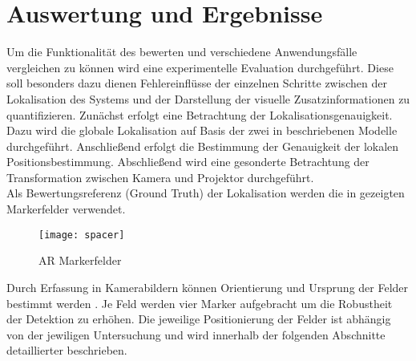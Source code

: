 \chapter{Auswertung und Ergebnisse}
\label{chap.results}

Um die Funktionalität des  bewerten und verschiedene Anwendungsfälle vergleichen zu können wird eine experimentelle Evaluation durchgeführt. Diese soll besonders dazu dienen Fehlereinflüsse der einzelnen Schritte zwischen der Lokalisation des Systems und der Darstellung der visuelle Zusatzinformationen zu quantifizieren. Zunächst erfolgt eine Betrachtung der Lokalisationsgenauigkeit. Dazu wird die globale Lokalisation auf Basis der zwei in  beschriebenen Modelle durchgeführt. Anschließend erfolgt die Bestimmung der Genauigkeit der lokalen Positionsbestimmung. Abschließend wird eine gesonderte Betrachtung der Transformation zwischen Kamera und Projektor durchgeführt.\\
Als Bewertungsreferenz (Ground Truth) der Lokalisation werden die in  gezeigten Markerfelder verwendet.

\begin{figure}[!ht]
	\begin{center}
		\texttt{[image: spacer]}
		\caption{AR Markerfelder}
		\label{fig.armarker}
	\end{center}
\end{figure}

Durch Erfassung in Kamerabildern können Orientierung und Ursprung der Felder bestimmt werden . Je Feld werden vier Marker aufgebracht um die Robustheit der Detektion zu erhöhen. Die jeweilige Positionierung der Felder ist abhängig von der jewiligen Untersuchung und wird innerhalb der folgenden Abschnitte detaillierter beschrieben. 


